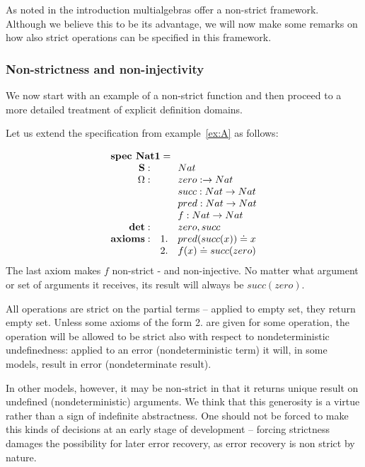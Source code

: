 \documentclass[10pt]{article}
\begin{document}
As noted in the introduction multialgebras offer a non-strict
framework. Although we believe this to be its advantage, we will now make some
remarks on how also  strict operations can be specified in this framework.


\subsubsection{Non-strictness and non-injectivity}

We now start
with an example of a non-strict function and then proceed to a more detailed treatment of
explicit definition domains.

\begin{example}\label{ex:B}
Let us extend the
specification from example~\ref{ex:A} as follows:

\[ \begin{array}{l}\begin{array}{r@{\hspace*{1em}}rlll}
\tit{\mbox{\bf spec\ Nat1} =\ \ }\\
	\Sorts:	&& Nat \\			
	\Ops: 	&& zero: \to  Nat\\
        	&& succ: Nat \to Nat\\
		&& pred:  Nat  \to Nat\\	
		&& f: Nat  \to Nat \\

	{\bf det}:
		&& zero, succ \\
	{\bf axioms}:	
		&1.& pred(succ(x))  \eleq  x \\
                &2.& f(x)  \eleq  succ(zero)
\end{array}
\end{array} \] 
The last axiom makes $f$ non-strict - and non-injective. No matter what
argument or set of arguments it receives, its result will always be
$succ(zero)$.
\end{example}
%
All operations are strict on the partial terms -- applied to empty set, they
return empty set.
Unless some axioms of the form 2. are given
for some operation, the operation will be allowed to be strict also with
respect to nondeterministic undefinedness: applied to an
error  (nondeterministic term) it will, in some models, result in error
(nondeterminate result). 

In other models, however, it may be non-strict in that it returns unique
result on undefined (nondeterministic) arguments.  We think that this
generosity is a virtue rather than a sign of indefinite abstractness. One
should not be forced to make this kinds of decisions at an early stage of
development -- forcing strictness  damages the possibility for later error
recovery, as error recovery is non strict by nature.
\end{document}
